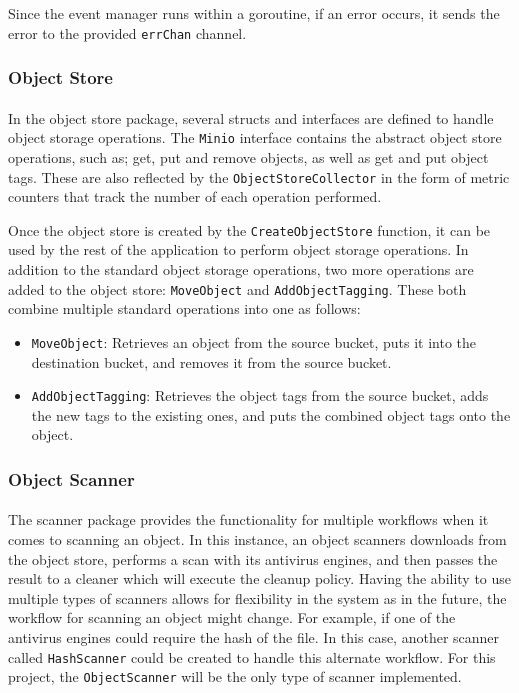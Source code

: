 \documentclass[12pt, conference, final, a4paper, onecolumn, compsoc]{IEEEtran}
\begin{document}
Since the event manager runs within a goroutine, if an error occurs, it sends
the error to the provided \texttt{errChan} channel.

\subsubsection*{Object Store}
\paragraph{}
In the object store package, several structs and interfaces are defined to
handle object storage operations. The \texttt{Minio} interface contains the
abstract object store operations, such as; get, put and remove objects, as well
as get and put object tags. These are also reflected by the
\texttt{ObjectStoreCollector} in the form of metric counters that track the
number of each operation performed.

Once the object store is created by the \texttt{CreateObjectStore} function, it
can be used by the rest of the application to perform object storage operations.
In addition to the standard object storage operations, two more operations are
added to the object store: \texttt{MoveObject} and \texttt{AddObjectTagging}.
These both combine multiple standard operations into one as follows:

\begin{itemize}
  \item \texttt{MoveObject}: Retrieves an object from the source bucket, puts it
  into the destination bucket, and removes it from the source bucket.
  \item \texttt{AddObjectTagging}: Retrieves the object tags from the source
  bucket, adds the new tags to the existing ones, and puts the combined object
  tags onto the object.
\end{itemize}

\subsubsection*{Object Scanner}
\paragraph{}
The scanner package provides the functionality for multiple workflows when it
comes to scanning an object. In this instance, an object scanners downloads from
the object store, performs a scan with its antivirus engines, and then passes
the result to a cleaner which will execute the cleanup policy. Having the
ability to use multiple types of scanners allows for flexibility in the system
as in the future, the workflow for scanning an object might change. For example,
if one of the antivirus engines could require the hash of the file. In this
case, another scanner called \texttt{HashScanner} could be created to handle
this alternate workflow. For this project, the \texttt{ObjectScanner} will be
the only type of scanner implemented.
\end{document}
